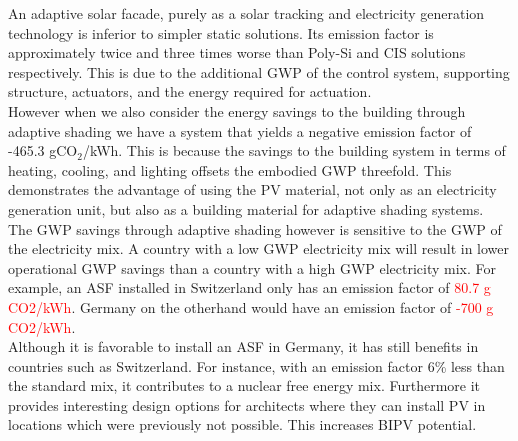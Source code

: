 
An adaptive solar facade, purely as a solar tracking and electricity generation technology is inferior to simpler static solutions. Its emission factor is approximately twice and three times worse than Poly-Si and CIS solutions respectively. This is due to the additional GWP of the control system, supporting structure, actuators, and the energy required for actuation. \\

However when we also consider the energy savings to the building through adaptive shading we have a system that yields a negative emission factor of -465.3 gCO${_2}$/kWh. This is because the savings to the building system in terms of heating, cooling, and lighting offsets the embodied GWP threefold. This demonstrates the advantage of using the PV material, not only as an electricity generation unit, but also as a building material for adaptive shading systems.\\


The GWP savings through adaptive shading however is sensitive to the GWP of the electricity mix. A country with a low GWP electricity mix will result in lower operational GWP savings than a country with a high GWP electricity mix. For example, an ASF installed in Switzerland only has an emission factor of \textcolor{red}{80.7 g CO2/kWh}. Germany on the otherhand would have an emission factor of \textcolor{red}{-700 g CO2/kWh}.\\

Although it is favorable to install an ASF in Germany, it has still benefits in countries such as Switzerland. For instance, with an emission factor 6\% less than the standard mix, it contributes to a nuclear free energy mix. Furthermore it provides interesting design options for architects where they can install PV in locations which were previously not possible. This increases BIPV potential.  \\

